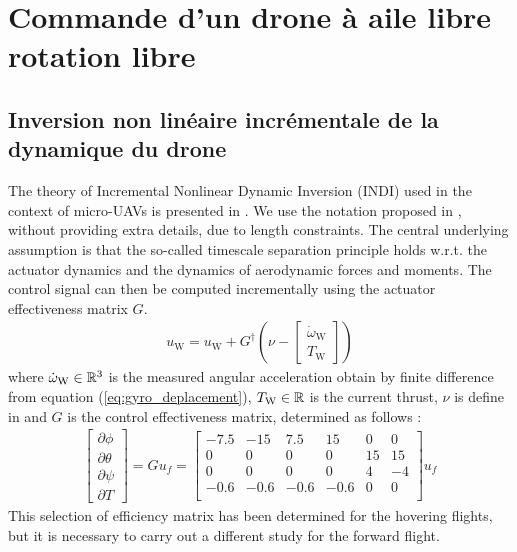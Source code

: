 \chapter{Commande d'un drone à aile libre rotation libre}
\minitoc

\section{Inversion non linéaire incrémentale de la dynamique du drone}
The theory of Incremental Nonlinear Dynamic Inversion (INDI) used in the context of micro-UAVs is presented in \cite{doi:10.2514/1.G001490}. We use the notation proposed in \cite{doi:10.2514/1.G004520}, without providing extra details, due to length constraints. The central underlying assumption is that the so-called timescale separation principle holds w.r.t. the actuator dynamics and the dynamics of aerodynamic forces and moments. The control signal can then be computed incrementally using the actuator effectiveness matrix $G$.
\begin{align}
    u_{\text{W}} = u_{\text{W}} + G^{\dag} (\nu - \begin{bmatrix}
    \dot{\omega}_{\text{W}} \\
    T_{\text{W}}
    \end{bmatrix})
\end{align}
where $ \dot{\omega}_{\text{W}} \in {\mathbb R}^{3}$ is the measured angular acceleration obtain by finite difference from equation (\ref{eq:gyro_deplacement}), $T_{\text{W}} \in {\mathbb R}$ is the current thrust, $\nu$ is define in \cite[equation (4)]{doi:10.2514/1.G004520} and $G$ is the control effectiveness matrix, determined as follows :
\begin{align*}
    \begin{bmatrix}
    \partial \phi \\
    \partial \theta \\
    \partial \psi \\
    \partial T
    \end{bmatrix}\! =\! G u_{f} \!=\!
    \begin{bmatrix}
    -7.5 & -15 & 7.5 & 15 & 0 & 0\\
    0 & 0 & 0 & 0 & 15 & 15 \\
    0 & 0 & 0 & 0 & 4 & -4 \\
    -0.6 & -0.6 & -0.6 & -0.6 & 0 & 0\\
    \end{bmatrix}
    u_{f}
\end{align*}
This selection of efficiency matrix has been determined for the hovering flights, but it is necessary to carry out a different study for the forward flight.


